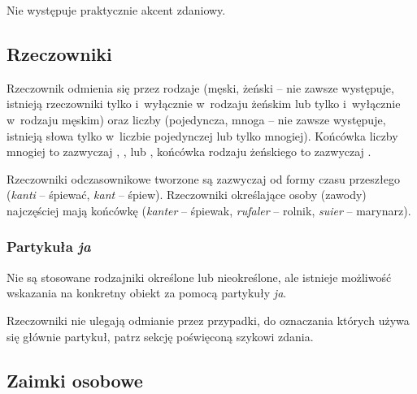 \begin{spacing}{1.1}
Nie występuje praktycznie akcent zdaniowy.

\subsection{Rzeczowniki}
Rzeczownik odmienia się przez rodzaje (męski, żeński -- nie zawsze występuje,
istnieją rzeczowniki tylko i~wyłącznie w~rodzaju żeńskim lub tylko i~wyłącznie
w~rodzaju męskim) oraz liczby (pojedyncza, mnoga -- nie zawsze występuje,
istnieją słowa tylko w~liczbie pojedynczej lub tylko mnogiej). Końcówka liczby
mnogiej to zazwyczaj , ,  lub , końcówka rodzaju
żeńskiego to zazwyczaj .


Rzeczowniki odczasownikowe tworzone są zazwyczaj od formy czasu przeszłego
(\emph{kanti} -- śpiewać, \emph{kant} -- śpiew). Rzeczowniki określające osoby
(zawody) najczęściej mają końcówkę  (\emph{kanter} -- śpiewak,
\emph{rufaler} -- rolnik, \emph{suier} -- marynarz).


\subsubsection{Partykuła \emph{ja}}

Nie są stosowane rodzajniki określone lub nieokreślone, ale istnieje możliwość
wskazania na konkretny obiekt za pomocą partykuły \emph{ja}.


Rzeczowniki nie ulegają odmianie przez przypadki, do oznaczania których używa
się głównie partykuł, patrz sekcję poświęconą szykowi zdania.

\subsection{Zaimki osobowe}

\begin{multicols}{2}


\end{multicols}
\end{spacing}
